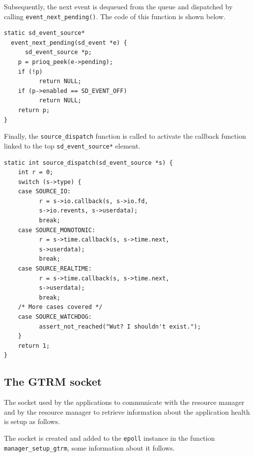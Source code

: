\documentclass[nobiblatex]{LTHthesis}
\begin{document}
Subsequently, the next event is dequeued from the queue and dispatched by
calling \texttt{event\_next\_pending()}. The code of this function is
shown below.
\begin{lstlisting}
static sd_event_source* 
  event_next_pending(sd_event *e) {
	  sd_event_source *p;
  	p = prioq_peek(e->pending);
  	if (!p)
  		  return NULL;
  	if (p->enabled == SD_EVENT_OFF)
  		  return NULL;
  	return p;
}
\end{lstlisting}
Finally, the \texttt{source\_dispatch} function is called to activate 
the callback function linked to the top \texttt{sd\_event\_source*} 
element.
\begin{lstlisting}
static int source_dispatch(sd_event_source *s) {
	int r = 0;
	switch (s->type) {
  	case SOURCE_IO:
  		  r = s->io.callback(s, s->io.fd, 
		  s->io.revents, s->userdata);
  		  break;
  	case SOURCE_MONOTONIC:
  		  r = s->time.callback(s, s->time.next, 
		  s->userdata);
  		  break;
  	case SOURCE_REALTIME:
  		  r = s->time.callback(s, s->time.next, 
		  s->userdata);
  		  break;
  	/* More cases covered */
  	case SOURCE_WATCHDOG:
  		  assert_not_reached("Wut? I shouldn't exist.");
	}
	return 1;
}
\end{lstlisting}

\subsection{The GTRM socket}

The socket used by the applications to communicate with the resource
manager and by the resource manager to retrieve information about the
application health is setup as follows.

The socket is created and added to the \texttt{epoll} instance in the
function \texttt{manager\_setup\_gtrm}, some information about it
follows.
\end{document}
